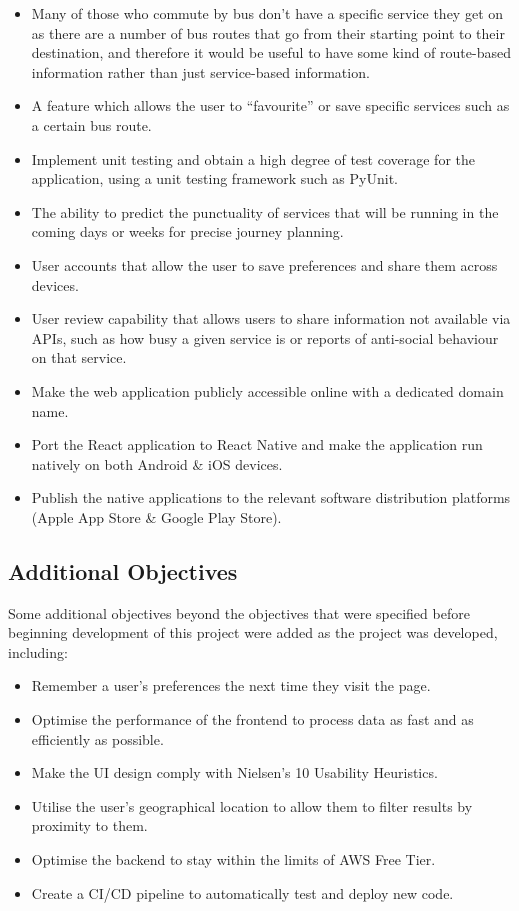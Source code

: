\documentclass[a4paper,11pt]{report}
\begin{document}
\begin{itemize}
    \item   Many of those who commute by bus don't have a specific service they get on as there are a number of bus routes that go from their starting point to their destination, and therefore it would be useful to have some kind of route-based information rather than just service-based information. 
    \item   A feature which allows the user to ``favourite'' or save specific services such as a certain bus route.
    \item   Implement unit testing and obtain a high degree of test coverage for the application, using a unit testing framework such as PyUnit.
    \item   The ability to predict the punctuality of services that will be running in the coming days or weeks for precise journey planning.
    \item   User accounts that allow the user to save preferences and share them across devices.
    \item   User review capability that allows users to share information not available via APIs, such as how busy a given service is or reports of anti-social behaviour on that service.
    \item   Make the web application publicly accessible online with a dedicated domain name.
    \item   Port the React application to React Native and make the application run natively on both Android \& iOS devices.
    \item   Publish the native applications to the relevant software distribution platforms (Apple App Store \& Google Play Store).
\end{itemize}

\subsection{Additional Objectives}
Some additional objectives beyond the objectives that were specified before beginning development of this project were added as the project was developed, including:
\begin{itemize}
    \item   Remember a user's preferences the next time they visit the page.
    \item   Optimise the performance of the frontend to process data as fast and as efficiently as possible.
    \item   Make the UI design comply with Nielsen's 10 Usability Heuristics\supercite{nielsenheuristics}.
    \item   Utilise the user's geographical location to allow them to filter results by proximity to them.
    \item   Optimise the backend to stay within the limits of AWS Free Tier\supercite{awsfree}.
    \item   Create a CI/CD pipeline to automatically test and deploy new code.
\end{itemize}
\end{document}
